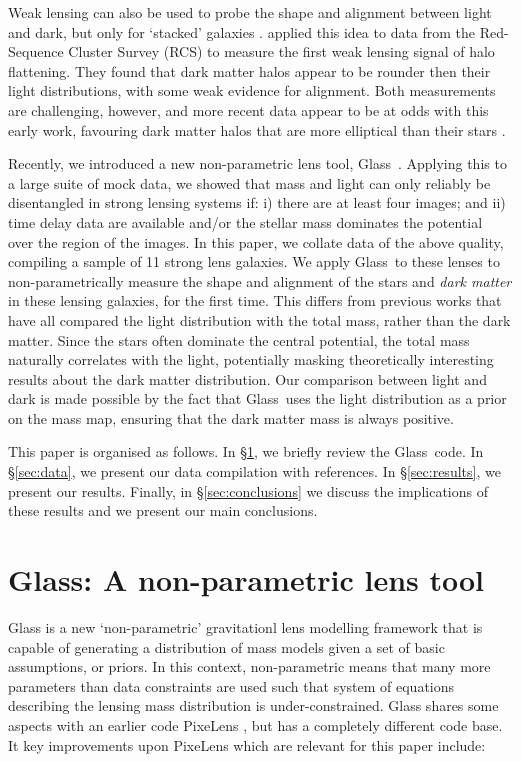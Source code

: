 \documentclass[useAMS,usenatbib]{mn2e}
\def\Glass{{\sc Glass}}
\def\PixeLens{{\sc PixeLens}}
\begin{document}
Weak lensing can also be used to probe the shape and alignment between light and dark, but only for `stacked' galaxies \citep{2000astro.ph..6281B,2000ApJ...538L.113N}. \citet{2004ApJ...606...67H} applied this idea to data from the Red-Sequence Cluster Survey (RCS) to measure the first weak lensing signal of halo flattening. They found that dark matter halos appear to be rounder then their light distributions, with some weak evidence for alignment. Both measurements are challenging, however, and more recent data appear to be at odds with this early work, favouring dark matter halos that are more elliptical than their stars \citep{2006MNRAS.370.1008M,2007ApJ...669...21P,2012A&A...545A..71V}.

Recently, we introduced a new non-parametric lens tool, \Glass\  \citep{2014arXiv1401.7990C}. Applying this to a large suite of mock data, we showed that mass and light can only reliably be disentangled in strong lensing systems if: i) there are at least four images; and ii) time delay data are available and/or the stellar mass dominates the potential over the region of the images. In this paper, we collate data of the above quality, compiling a sample of 11 strong lens galaxies. We apply \Glass\ to these lenses to non-parametrically measure the shape and alignment of the stars and {\it dark matter}  in these lensing galaxies, for the first time. This differs from previous works that have all compared the light distribution with the total mass, rather than the dark matter. Since the stars often dominate the central potential, the total mass naturally correlates with the light, potentially masking theoretically interesting results about the dark matter distribution. Our comparison between light and dark is made possible by the fact that \Glass\ uses the light distribution as a prior on the mass map, ensuring that the dark matter mass is always positive.

This paper is organised as follows. In \S\ref{sec:glass}, we briefly review the \Glass\ code. In \S\ref{sec:data}, we present our data compilation with references. In \S\ref{sec:results}, we present our results. Finally, in \S\ref{sec:conclusions} we discuss the implications of these results and we present our main conclusions.


\section{\Glass: A non-parametric lens tool}\label{sec:glass}

\Glass{} is a new `non-parametric' gravitationl lens modelling framework
\citep{2014arXiv1401.7990C} that is capable of generating a distribution of
mass models given a set of basic assumptions, or priors.  In this context,
non-parametric means that  many more parameters than data constraints are used
such that system of equations describing the lensing mass distribution is
under-constrained.  \Glass{} shares some aspects with an earlier code
\PixeLens{} \citep{Saha2004,2008ApJ...679...17C}, but has a completely
different code base. It key improvements upon \PixeLens{} which are relevant
for this paper include:
\end{document}
